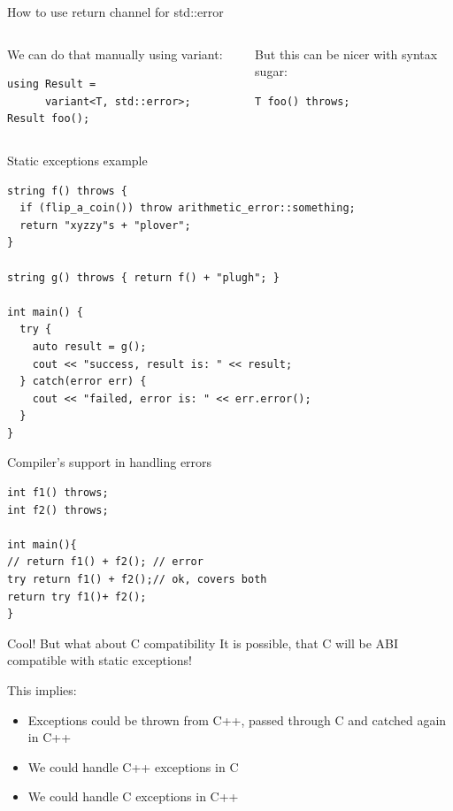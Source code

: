 \documentclass[10pt]{beamer}
\begin{document}
\begin{frame}[fragile]{How to use return channel for std::error}
	\begin{columns}[T]
		\begin{column}{0.48\linewidth}
			We can do that manually using variant:
			\begin{verbatim}
using Result = 
      variant<T, std::error>;			
Result foo();
			\end{verbatim}
		\end{column}
		\begin{column}{0.48\linewidth}
			But this can be nicer with syntax sugar:
			\begin{verbatim}
T foo() throws;
			\end{verbatim}
		\end{column}
	\end{columns}
\end{frame}

\begin{frame}[fragile]{Static exceptions example}
	
	\begin{verbatim}
string f() throws {
  if (flip_a_coin()) throw arithmetic_error::something;
  return "xyzzy"s + "plover"; 
}

string g() throws { return f() + "plugh"; } 

int main() {
  try {
    auto result = g();
    cout << "success, result is: " << result;
  } catch(error err) {
    cout << "failed, error is: " << err.error();
  }
}
	\end{verbatim}
\end{frame}

\begin{frame}[fragile]{Compiler's support in handling errors}
	\begin{verbatim}
int f1() throws;	
int f2() throws;

int main(){
// return f1() + f2(); // error
try return f1() + f2();// ok, covers both 
return try f1()+ f2();
}
	\end{verbatim}
\end{frame}

\begin{frame}{Cool! But what about C compatibility}
	It is possible, that C will be ABI compatible with static exceptions!
	
	This implies:
	
	\begin{itemize}
		\item Exceptions could be thrown from C++, passed through C and catched again in C++
		\item We could handle C++ exceptions in C
		\item We could handle C exceptions in C++
	\end{itemize}
\end{frame}
\end{document}
